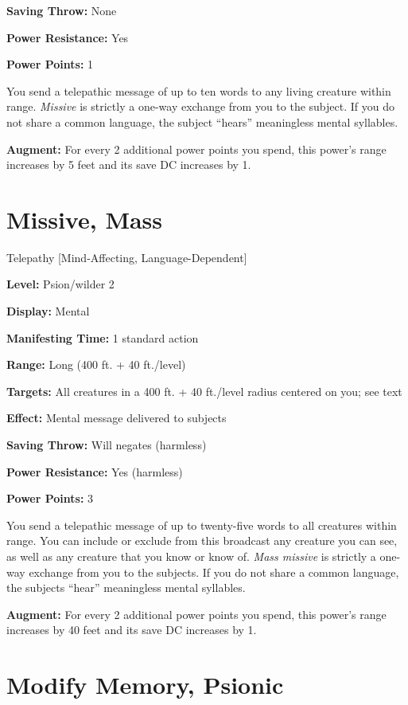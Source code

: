 \documentclass{article}
\begin{document}
\textbf{Saving Throw:} None

\textbf{Power Resistance:} Yes

\textbf{Power Points:} 1

You send a telepathic message of up to ten words to any living creature within 
range. \textit{Missive }is strictly a one-way exchange from you to the subject. 
If you do not share a common language, the subject ``hears'' meaningless mental 
syllables.

\textbf{Augment:} For every 2 additional power points you spend, this power's range 
increases by 5 feet and its save DC increases by 1.

\vspace{12pt}
\section*{Missive, Mass}

Telepathy [Mind-Affecting, Language-Dependent]

\textbf{Level:} Psion/wilder 2

\textbf{Display:} Mental

\textbf{Manifesting Time:} 1 standard action

\textbf{Range:} Long (400 ft. + 40 ft./level)

\textbf{Targets:} All creatures in a 400 ft. + 40 ft./level radius centered on 
you; see text

\textbf{Effect:} Mental message delivered to subjects

\textbf{Saving Throw:} Will negates (harmless)

\textbf{Power Resistance:} Yes (harmless)

\textbf{Power Points:} 3

You send a telepathic message of up to twenty-five words to all creatures within 
range. You can include or exclude from this broadcast any creature you can see, 
as well as any creature that you know or know of. \textit{Mass missive }is strictly 
a one-way exchange from you to the subjects. If you do not share a common language, 
the subjects ``hear'' meaningless mental syllables.

\textbf{Augment:} For every 2 additional power points you spend, this power's range 
increases by 40 feet and its save DC increases by 1.

\vspace{12pt}
\section*{Modify Memory, Psionic}
\end{document}
